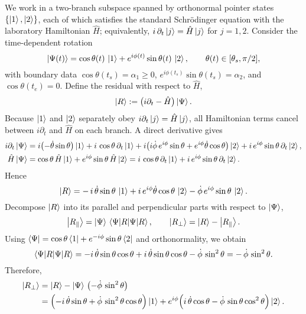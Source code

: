 \documentclass[11pt,letterpaper]{article}
\begin{document}
We work in a two-branch subspace spanned by orthonormal pointer states $\{\ket{1},\ket{2}\}$, each of which satisfies the standard Schrödinger equation with the laboratory Hamiltonian $\hat H$; equivalently, $i\,\partial_t\ket{j}=\hat H\ket{j}$ for $j=1,2$. Consider the time-dependent rotation
\begin{equation}
\ket{\Psi(t)}=\cos\theta(t)\,\ket{1}+e^{i\phi(t)}\sin\theta(t)\,\ket{2},
\qquad \theta(t)\in[\theta_s,\pi/2],
\label{eq:A-two-branch-ansatz}
\end{equation}
with boundary data $\cos\theta(t_s)=\alpha_1\ge 0$, $e^{i\phi(t_s)}\sin\theta(t_s)=\alpha_2$, and $\cos\theta(t_e)=0$. Define the residual with respect to $\hat H$,
\begin{equation}
\ket{R}:=\bigl(i\partial_t-\hat H\bigr)\ket{\Psi}.
\end{equation}
Because $\ket{1}$ and $\ket{2}$ separately obey $i\partial_t\ket{j}=\hat H\ket{j}$, all Hamiltonian terms cancel between $i\partial_t$ and $\hat H$ on each branch. A direct derivative gives
\begin{align}
i\partial_t\ket{\Psi}
&= i\bigl(-\dot\theta\sin\theta\bigr)\ket{1}
   + i\,\cos\theta\,\partial_t\ket{1}
   + i\bigl(i\dot\phi\,e^{i\phi}\sin\theta + e^{i\phi}\dot\theta\cos\theta\bigr)\ket{2}
   + i\,e^{i\phi}\sin\theta\,\partial_t\ket{2},\\
\hat H\ket{\Psi}
&= \cos\theta\,\hat H\ket{1}+e^{i\phi}\sin\theta\,\hat H\ket{2}
 = i\,\cos\theta\,\partial_t\ket{1}+i\,e^{i\phi}\sin\theta\,\partial_t\ket{2}.
\end{align}
Hence
\begin{equation}
\ket{R}
= -\,i\,\dot\theta\sin\theta\,\ket{1}
 + i\,e^{i\phi}\dot\theta\cos\theta\,\ket{2}
 - \dot\phi\,e^{i\phi}\sin\theta\,\ket{2}.
\label{eq:A-R-raw}
\end{equation}
Decompose $\ket{R}$ into its parallel and perpendicular parts with respect to $\ket{\Psi}$,
\begin{equation}
\ket{R_\parallel}=\ket{\Psi}\,\braket{\Psi|R},\qquad
\ket{R_\perp}=\ket{R}-\ket{R_\parallel}.
\end{equation}
Using $\bra{\Psi}=\cos\theta\bra{1}+e^{-i\phi}\sin\theta\bra{2}$ and orthonormality, we obtain
\begin{equation}
\braket{\Psi|R}
= -i\,\dot\theta\sin\theta\cos\theta
  + i\,\dot\theta\sin\theta\cos\theta
  - \dot\phi\,\sin^2\theta
= -\,\dot\phi\,\sin^2\theta.
\label{eq:A-parallel}
\end{equation}
Therefore,
\begin{align}
\ket{R_\perp}
&=\ket{R}-\ket{\Psi}\,\bigl(-\dot\phi\,\sin^2\theta\bigr)\nonumber\\
&=\Bigl(-i\,\dot\theta\sin\theta+\dot\phi\,\sin^2\theta\cos\theta\Bigr)\ket{1}
 + e^{i\phi}\Bigl(i\,\dot\theta\cos\theta-\dot\phi\,\sin\theta\cos^2\theta\Bigr)\ket{2}.
\label{eq:A-Rperp}
\end{align}
\end{document}
